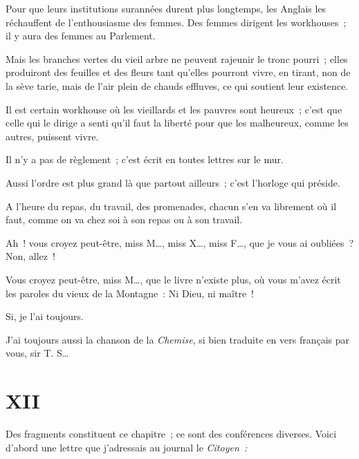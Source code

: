 \documentclass[french,twoside]{book} %
\newcommand\chapteropen{} %
\newcommand\chaptercont{} %
\newcommand\chapterclose{} %
\begin{document}
Pour que leurs institutions surannées durent plus longtemps, les Anglais les réchauffent de l’enthousiasme des femmes. Des femmes dirigent les workhouses ; il y aura des femmes au Parlement.\par
Mais les branches vertes du vieil arbre ne peuvent rajeunir le tronc pourri ; elles produiront des feuilles et des fleurs tant qu’elles pourront  vivre, en tirant, non de la sève tarie, mais de l’air plein de chauds effluves, ce qui soutient leur existence.\par
Il est certain workhouse où les vieillards et les pauvres sont heureux ; c’est que celle qui le dirige a senti qu’il faut la liberté pour que les malheureux, comme les autres, puissent vivre.\par
Il n’y a pas de règlement ; c’est écrit en toutes lettres sur le mur.\par
Aussi l’ordre est plus grand là que partout ailleurs ; c’est l’horloge qui préside.\par
A l’heure du repas, du travail, des promenades, chacun s’en va librement où il faut, comme on va chez soi à son repas ou à son travail.\par
Ah ! vous croyez peut-être, miss M…, miss X…, miss F…, que je vous ai oubliées ? Non, allez !\par
Vous croyez peut-être, miss M…, que le livre n’existe plus, où vous m’avez écrit les paroles du vieux de la Montagne : Ni Dieu, ni maître !\par
Si, je l’ai toujours.\par
J’ai toujours aussi la chanson de la \emph{Chemise}, si bien traduite en vers français par vous, sir T. S…
\chapterclose


\chapteropen
 \chapter[{XII}]{XII}
\label{p2.12}

\chaptercont
\noindent Des fragments constituent ce chapitre ; ce sont des conférences diverses. Voici d’abord une lettre que j’adressais au journal le \emph{Citoyen :}\par
\end{document}
